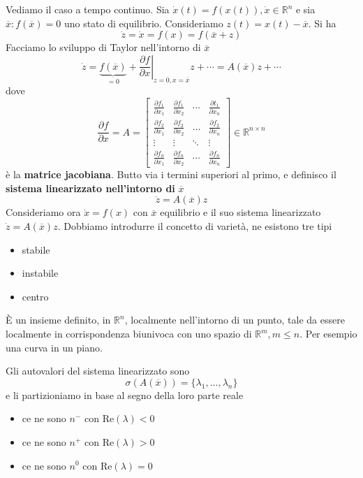 \documentclass[10pt,a4paper]{book}
\begin{document}
Vediamo il caso a tempo continuo. Sia $\dot{x}( t) =f( x( t)) ,\dot{x} \in \mathbb{R}^{n}$ e sia $\overline{x} :f(\overline{x}) =0$ uno stato di equilibrio. Consideriamo $z( t) =x( t) -\overline{x}$. Si ha
\begin{equation*}
\dot{z} =\dot{x} =f( x) =f(\overline{x} +z)
\end{equation*}
Facciamo lo sviluppo di Taylor nell'intorno di $\overline{x}$
\begin{equation*}
\dot{z} =\underbrace{f(\overline{x})}_{=0} +\left. \frac{\partial f}{\partial x}\right| _{z=0,x=\overline{x}} z+\cdots =A(\overline{x}) z+\cdots 
\end{equation*}
dove
\begin{equation*}
\frac{\partial f}{\partial x} =A=\begin{bmatrix}
\frac{\partial f_{1}}{\partial x_{1}} & \frac{\partial f_{1}}{\partial x_{2}} & \cdots  & \frac{\partial t_{1}}{\partial x_{n}}\\
\frac{\partial f_{2}}{\partial x_{1}} & \frac{\partial f_{2}}{\partial x_{2}} & \dotsc  & \frac{\partial f_{2}}{\partial x_{n}}\\
\vdots  & \vdots  & \ddots  & \vdots \\
\frac{\partial f_{n}}{\partial x_{1}} & \frac{\partial f_{n}}{\partial x_{2}} & \cdots  & \frac{\partial f_{n}}{\partial x_{n}}
\end{bmatrix} \in \mathbb{R}^{n\times n}
\end{equation*}
è la \textbf{matrice jacobiana}. Butto via i termini superiori al primo, e definisco il \textbf{sistema linearizzato nell'intorno di }$\overline{x}$
\begin{equation*}
\boxed{\dot{z} =A(\overline{x}) z}
\end{equation*}
Consideriamo ora $\dot{x} =f( x)$ con $\overline{x}$ equilibrio e il suo sistema linearizzato $\dot{z} =A(\overline{x}) z$. Dobbiamo introdurre il concetto di varietà, ne esistono tre tipi
\begin{itemize}
\item stabile
\item instabile
\item centro
\end{itemize}

È un insieme definito, in $\mathbb{R}^{n}$, localmente nell'intorno di un punto, tale da essere localmente in corrispondenza biunivoca con uno spazio di $\mathbb{R}^{m} ,m\leqslant n$. Per esempio una curva in un piano.

Gli autovalori del sistema linearizzato sono
\begin{equation*}
\sigma ( A(\overline{x})) =\{\lambda _{1} ,\dotsc ,\lambda _{n}\}
\end{equation*}
e li partizioniamo in base al segno della loro parte reale
\begin{itemize}
\item ce ne sono $n^{-}$ con $\mathrm{Re}( \lambda ) < 0$
\item ce ne sono $n^{+}$ con $\mathrm{Re}( \lambda )  >0$
\item ce ne sono $n^{0}$ con $\mathrm{Re}( \lambda ) =0$
\end{itemize}
\end{document}
